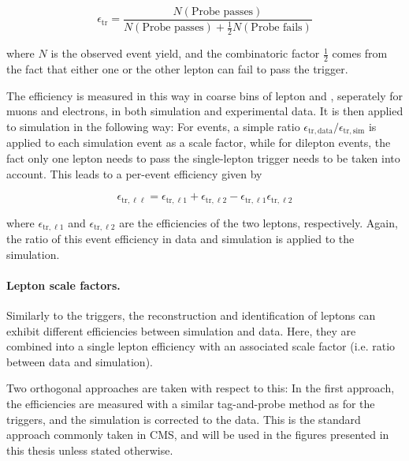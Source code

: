 \begin{equation}
    \epsilon_{\mathrm{tr}} = \frac{N (\text{Probe passes})}{ N (\text{Probe passes}) + \frac{1}{2} N (\text{Probe fails}) }
\end{equation}

where $N$ is the observed event yield, and the combinatoric factor $\frac{1}{2}$ comes from the fact that either one or the other lepton can fail to pass the trigger. 

The efficiency is measured in this way in coarse bins of lepton \pt and \abseta, seperately for muons and electrons, in both simulation and experimental data. It is then applied to simulation in the following way: For \ljets events, a simple ratio $\epsilon_{\mathrm{tr,data}} / \epsilon_{\mathrm{tr,sim}}$ is applied to each simulation event as a scale factor, while for dilepton events, the fact only one lepton needs to pass the single-lepton trigger needs to be taken into account. This leads to a per-event efficiency given by

\begin{equation}
\label{eq:ttxs:triggersf}
    \epsilon_{\mathrm{tr,\ell \ell}} = \epsilon_{\mathrm{tr,\ell 1}} + \epsilon_{\mathrm{tr,\ell 2}} - \epsilon_{\mathrm{tr,\ell 1}} \epsilon_{\mathrm{tr,\ell 2}}
\end{equation}

where $\epsilon_{\mathrm{tr,\ell 1}}$ and $\epsilon_{\mathrm{tr,\ell 2}}$ are the efficiencies of the two leptons, respectively. Again, the ratio of this event efficiency in data and simulation is applied to the simulation.

\paragraph{Lepton scale factors.}

Similarly to the triggers, the reconstruction and identification of leptons can exhibit different efficiencies between simulation and data. Here, they are combined into a single lepton efficiency with an associated scale factor (i.e. ratio between data and simulation).

Two orthogonal approaches are taken with respect to this: In the first approach, the efficiencies are measured with a similar tag-and-probe method as for the triggers, and the simulation is corrected to the data. This is the standard approach commonly taken in CMS, and will be used in the figures presented in this thesis unless stated otherwise.

